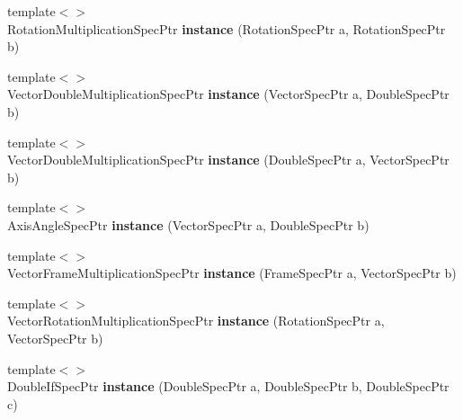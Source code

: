 \begin{DoxyCompactItemize}
\item 
\hypertarget{namespacegiskard__suturo_a02423f72cda3ff296f5ced0976b2d0c7}{{\footnotesize template$<$$>$ }\\Rotation\-Multiplication\-Spec\-Ptr {\bfseries instance} (Rotation\-Spec\-Ptr a, Rotation\-Spec\-Ptr b)}\label{namespacegiskard__suturo_a02423f72cda3ff296f5ced0976b2d0c7}

\item 
\hypertarget{namespacegiskard__suturo_a11d4c3037b4e9f3d390def545608e485}{{\footnotesize template$<$$>$ }\\Vector\-Double\-Multiplication\-Spec\-Ptr {\bfseries instance} (Vector\-Spec\-Ptr a, Double\-Spec\-Ptr b)}\label{namespacegiskard__suturo_a11d4c3037b4e9f3d390def545608e485}

\item 
\hypertarget{namespacegiskard__suturo_a84565c73f0395cdd86229a2ed4e1f442}{{\footnotesize template$<$$>$ }\\Vector\-Double\-Multiplication\-Spec\-Ptr {\bfseries instance} (Double\-Spec\-Ptr a, Vector\-Spec\-Ptr b)}\label{namespacegiskard__suturo_a84565c73f0395cdd86229a2ed4e1f442}

\item 
\hypertarget{namespacegiskard__suturo_a5ab6190bdf533f65701eff6d7e7231f5}{{\footnotesize template$<$$>$ }\\Axis\-Angle\-Spec\-Ptr {\bfseries instance} (Vector\-Spec\-Ptr a, Double\-Spec\-Ptr b)}\label{namespacegiskard__suturo_a5ab6190bdf533f65701eff6d7e7231f5}

\item 
\hypertarget{namespacegiskard__suturo_a541528d2121c69173fa0bd80c4d86eb6}{{\footnotesize template$<$$>$ }\\Vector\-Frame\-Multiplication\-Spec\-Ptr {\bfseries instance} (Frame\-Spec\-Ptr a, Vector\-Spec\-Ptr b)}\label{namespacegiskard__suturo_a541528d2121c69173fa0bd80c4d86eb6}

\item 
\hypertarget{namespacegiskard__suturo_a59f2293821d4e21e06a29f541377471b}{{\footnotesize template$<$$>$ }\\Vector\-Rotation\-Multiplication\-Spec\-Ptr {\bfseries instance} (Rotation\-Spec\-Ptr a, Vector\-Spec\-Ptr b)}\label{namespacegiskard__suturo_a59f2293821d4e21e06a29f541377471b}

\item 
\hypertarget{namespacegiskard__suturo_a5dcf91209d309afe71663a508775c4b2}{{\footnotesize template$<$$>$ }\\Double\-If\-Spec\-Ptr {\bfseries instance} (Double\-Spec\-Ptr a, Double\-Spec\-Ptr b, Double\-Spec\-Ptr c)}\label{namespacegiskard__suturo_a5dcf91209d309afe71663a508775c4b2}


\end{DoxyCompactItemize}
